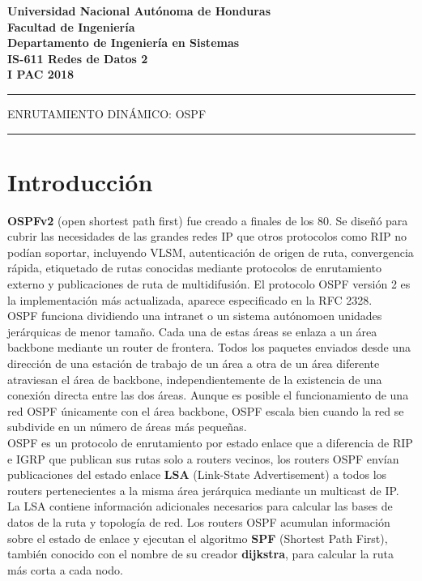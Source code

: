 \documentclass[12pt]{article}
\begin{document}
\begin{center}
\bfseries{Universidad Nacional Autónoma de Honduras}\\
Facultad de Ingeniería\\
Departamento de Ingeniería en Sistemas\\
\bigskip
\bigskip
IS-611 Redes de Datos 2\\
I PAC 2018

\noindent\rule{\textwidth}{1pt}
\huge{ENRUTAMIENTO DINÁMICO: OSPF}
\noindent\rule{\textwidth}{1pt}
\end{center}
 
 \section{Introducción}   
\textbf{OSPFv2} (open shortest path first) fue creado a finales de los 80. Se diseñó para cubrir las necesidades de las grandes redes IP que otros protocolos como RIP no podían soportar, incluyendo VLSM, autenticación de origen de ruta, convergencia rápida, etiquetado de rutas conocidas mediante protocolos de enrutamiento externo y publicaciones de ruta de multidifusión. El protocolo OSPF versión 2 es la implementación más actualizada, aparece especificado en la RFC 2328.\\

OSPF funciona dividiendo una intranet o un sistema autónomoen unidades jerárquicas de menor tamaño. Cada una de estas áreas se enlaza a un área backbone mediante un router de frontera. Todos los paquetes enviados desde una dirección de una estación de trabajo de un área a otra de un área diferente atraviesan el área de backbone, independientemente de la existencia de una conexión directa entre las dos áreas. Aunque es posible el funcionamiento de una red OSPF únicamente con el área backbone, OSPF escala bien cuando la red se subdivide en un número de áreas más pequeñas.\\

OSPF es un protocolo de enrutamiento por estado enlace que a diferencia de RIP e IGRP que publican sus rutas solo a routers vecinos, los routers OSPF envían publicaciones del estado enlace \textbf{LSA} (Link-State Advertisement) a todos los routers pertenecientes a la misma área jerárquica mediante un multicast de IP. La LSA contiene información adicionales necesarios para calcular las bases de datos de la ruta y topología de red. Los routers OSPF acumulan información sobre el estado de enlace y ejecutan el algoritmo \textbf{SPF} (Shortest Path First), también conocido con el nombre de su creador \textbf{dijkstra}, para calcular la ruta más corta a cada nodo.\\
\end{document}
